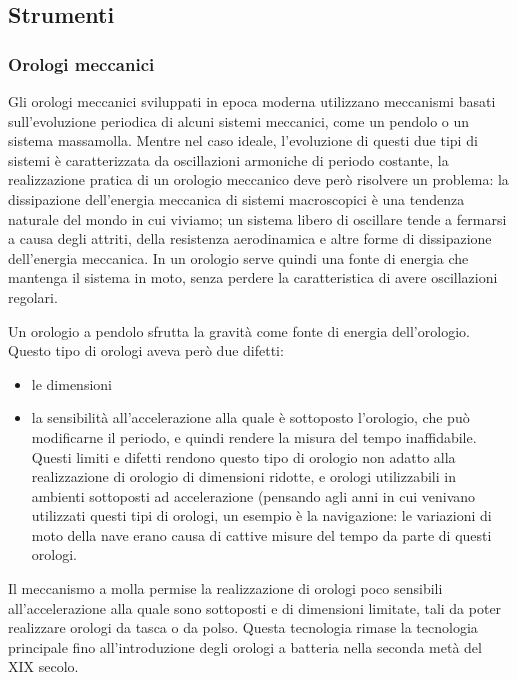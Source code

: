 \documentclass[letterpaper,10pt,italian]{jupyterBook}
\begin{document}
\subsection{Strumenti}
\label{\detokenize{ch/intro/physical_quantities-time:strumenti}}

\subsubsection{Orologi meccanici}
\label{\detokenize{ch/intro/physical_quantities-time:orologi-meccanici}}
\sphinxAtStartPar
Gli orologi meccanici sviluppati in epoca moderna utilizzano meccanismi basati sull’evoluzione periodica di alcuni sistemi meccanici, come un pendolo o un sistema massa\sphinxhyphen{}molla. Mentre nel caso ideale, l’evoluzione di questi due tipi di sistemi è caratterizzata da oscillazioni armoniche di periodo costante, la realizzazione pratica di un orologio meccanico deve però risolvere un problema: la dissipazione dell’energia meccanica di sistemi macroscopici è una tendenza naturale del mondo in cui viviamo; un sistema libero di oscillare tende a fermarsi a causa degli attriti, della resistenza aerodinamica e altre forme di dissipazione dell’energia meccanica. In un orologio serve quindi una fonte di energia che mantenga il sistema in moto, senza perdere la caratteristica di avere oscillazioni regolari.

\sphinxAtStartPar
{} Un orologio a pendolo sfrutta la gravità come fonte di energia dell’orologio. Questo tipo di orologi aveva però due difetti:
\begin{itemize}
\item {} 
\sphinxAtStartPar
le dimensioni

\item {} 
\sphinxAtStartPar
la sensibilità all’accelerazione alla quale è sottoposto l’orologio, che può modificarne il periodo, e quindi rendere la misura del tempo inaffidabile.
Questi limiti e difetti rendono questo tipo di orologio non adatto alla realizzazione di orologio di dimensioni ridotte, e orologi utilizzabili in ambienti sottoposti ad accelerazione (pensando agli anni in cui venivano utilizzati questi tipi di orologi, un esempio è la navigazione: le variazioni di moto della nave erano causa di cattive misure del tempo da parte di questi orologi.

\end{itemize}

\sphinxAtStartPar
{} Il meccanismo a molla permise la realizzazione di orologi poco sensibili all’accelerazione alla quale sono sottoposti e di dimensioni limitate, tali da poter realizzare orologi da tasca o da polso. Questa tecnologia rimase la tecnologia principale fino all’introduzione degli orologi a batteria nella seconda metà del XIX secolo.
\end{document}
